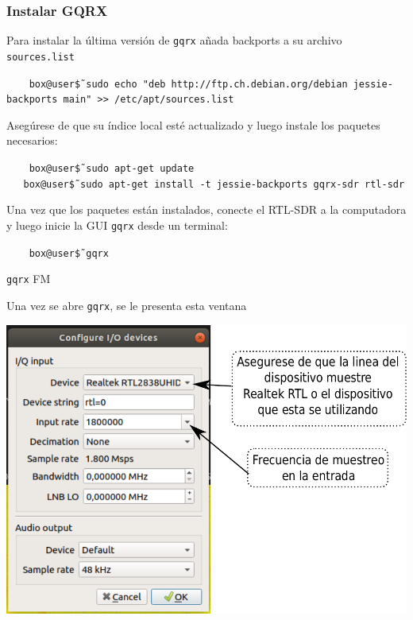 \begin{frame}
\frametitle{Instalar GQRX }


Para instalar la última versión de {\tt gqrx} añada backports a su archivo {\tt sources.list}

\begin{block}{}
  \texttt{
  \ \ \  box@user\~\$ sudo echo "deb http://ftp.ch.debian.org/debian jessie-backports main" >> /etc/apt/sources.list
}
\end{block} 

Asegúrese de que su índice local esté actualizado y luego instale los paquetes necesarios: 

\begin{block}{}
  \texttt{
  \ \ \  box@user\~\$ sudo apt-get update \\
  \ \ \  box@user\~\$ sudo apt-get install -t jessie-backports gqrx-sdr rtl-sdr  \\
}
\end{block} 

Una vez que los paquetes están instalados, conecte el RTL-SDR a la computadora y luego inicie la GUI {\tt gqrx} desde un terminal: 


\begin{block}{}
  \texttt{
  \ \ \ box@user\~\$ gqrx
}
\end{block} 


\end{frame}

\begin{frame}{{\tt gqrx} FM}

Una vez se abre {\tt gqrx}, se le presenta esta ventana
\vspace{0.5cm}
\begin{center}
\vspace{-0.3cm}
\includegraphics[width=.7\textwidth]{parte2/lab6/pdf/lab6_p_1.pdf}
\end{center}

\end{frame}

